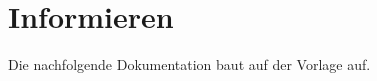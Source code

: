 \chapter{Informieren}

Die nachfolgende Dokumentation baut auf der Vorlage \cite{Buhler_ipa-template_2022} auf.